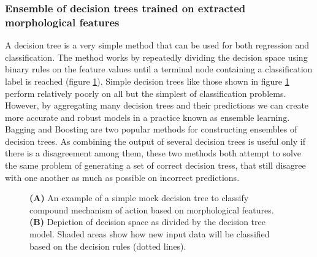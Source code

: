 \documentclass[a4paper,11pt,twoside,openright]{scrbook}
\begin{document}
\subsubsection{Ensemble of decision trees trained on extracted morphological features}
A decision tree is a very simple method that can be used for both regression and classification.
The method works by repeatedly dividing the decision space using binary rules on the feature values until a terminal node containing a classification label is reached (figure \ref{figure:decision_tree}).
Simple decision trees like those shown in figure \ref{figure:decision_tree} perform relatively poorly on all but the simplest of classification problems.
However, by aggregating many decision trees and their predictions we can create more accurate and robust models in a practice known as ensemble learning. \cite{Opitz1999}
Bagging \cite{Breiman1996} and Boosting \cite{Freund1996} are two popular methods for constructing ensembles of decision trees.
As combining the output of several decision trees is useful only if there is a disagreement among them, these two methods both attempt to solve the same problem of generating a set of correct decision tress, that still disagree with one another as much as possible on incorrect predictions.


\begin{figure}
    \captionsetup{width=0.8\textwidth}
    \caption[Diagram of a simple decision tree]{\textbf{(A)} An example of a simple mock decision tree to classify compound mechanism of action based on morphological features. \textbf{(B)} Depiction of decision space as divided by the decision tree model. Shaded areas show how new input data will be classified based on the decision rules (dotted lines).}
    
    \label{figure:decision_tree}
\end{figure}
\end{document}
